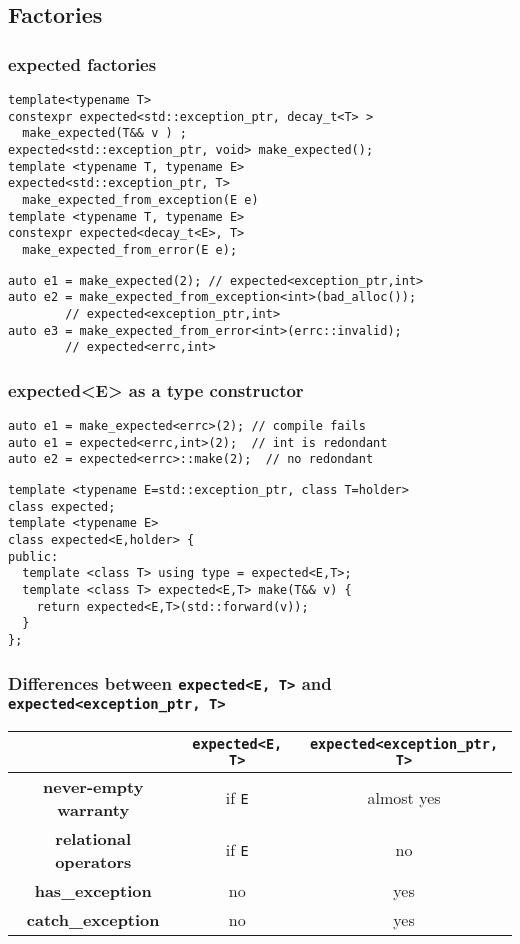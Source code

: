 \documentclass[xcolor=dvipsnames]{beamer}
\newcommand{\cpp}[1]{\lstinline{#1}}
\begin{document}
\subsection{Factories}
\begin{frame}[fragile]
\frametitle{expected factories}

\begin{lstlisting}
template<typename T>
constexpr expected<std::exception_ptr, decay_t<T> > 
  make_expected(T&& v ) ;
expected<std::exception_ptr, void> make_expected();
template <typename T, typename E>
expected<std::exception_ptr, T> 
  make_expected_from_exception(E e)
template <typename T, typename E>
constexpr expected<decay_t<E>, T> 
  make_expected_from_error(E e);
\end{lstlisting}
\begin{lstlisting}
auto e1 = make_expected(2); // expected<exception_ptr,int>
auto e2 = make_expected_from_exception<int>(bad_alloc()); 
		// expected<exception_ptr,int>
auto e3 = make_expected_from_error<int>(errc::invalid); 
		// expected<errc,int>
\end{lstlisting}
\end{frame}
\begin{frame}[fragile]
\frametitle{expected<E> as a type constructor}

\begin{lstlisting}
auto e1 = make_expected<errc>(2); // compile fails
auto e1 = expected<errc,int>(2);  // int is redondant
auto e2 = expected<errc>::make(2);  // no redondant
\end{lstlisting}

\begin{lstlisting}
template <typename E=std::exception_ptr, class T=holder>
class expected;
template <typename E>
class expected<E,holder> {
public:
  template <class T> using type = expected<E,T>;
  template <class T> expected<E,T> make(T&& v) {
    return expected<E,T>(std::forward(v));
  }
};
\end{lstlisting}
\end{frame}
\begin{frame}[fragile]
\frametitle{Differences between \cpp{expected<E, T>} and \cpp{expected<exception_ptr, T>}}

\begin{tabular}{|c|c|c|}
\hline
                    & \cpp{expected<E, T>} & \cpp{expected<exception_ptr, T>}  \\
\hline
\textbf{never-empty warranty} & if \cpp{E} & almost yes \\
\hline
\textbf{relational operators} & if \cpp{E} & no \\
\hline
\textbf{has\_exception} & no & yes \\
\hline
\textbf{catch\_exception} & no & yes \\
\hline
\end{tabular}
\end{frame}
\end{document}
